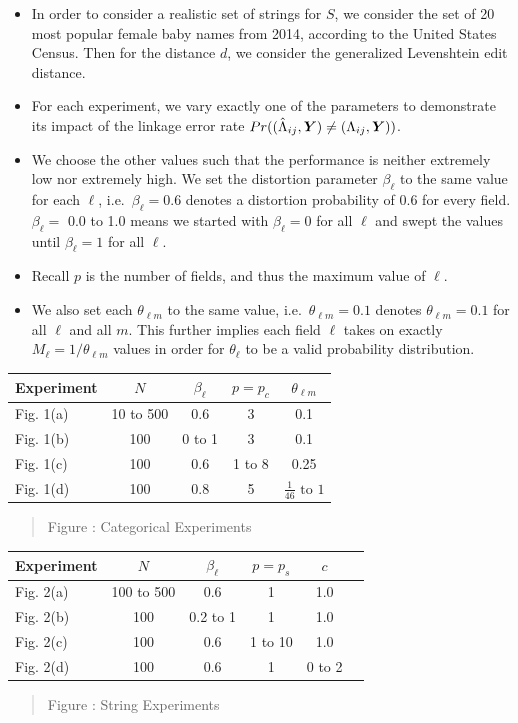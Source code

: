 \documentclass[portrait,a0,final]{a0poster}
\newenvironment{poster}{
  \begin{center}
  \begin{minipage}[c]{0.98\textwidth}
}{
  \end{minipage}
  \end{center}
}
\newcommand{\mycaption}[1]{
  \vspace{0.25cm}
  \begin{quote}
    {{\sc Figure} \arabic{figure}: #1}
  \end{quote}
  \vspace{0.25cm}
  \stepcounter{figure}
}
\begin{document}
\begin{poster}
\begin{multicols}{3}
\begin{itemize}
\item In order to consider a realistic set of strings for $S$, we consider the set of 20 most popular female baby names from 2014, according to the United States Census. Then for the distance $d$, we consider the generalized Levenshtein edit distance.
\item For each experiment, we vary exactly one of the parameters to demonstrate its impact of the linkage error rate $Pr( (\hat{\Lambda}_{ij}, \boldsymbol{Y}) \ne (\Lambda_{ij}, \boldsymbol{Y}))$. 
\item We choose the other values such that the performance is neither extremely low nor extremely high. We set the distortion parameter $\beta_\ell$ to the same value for each $\ell$, i.e.\ $\beta_\ell = 0.6$ denotes a distortion probability of 0.6 for every field. $\beta_\ell = $ 0.0 to 1.0 means we started with $\beta_\ell = 0$ for all $\ell$ and swept the values until $\beta_\ell = 1$ for all $\ell$. \item Recall $p$ is the number of fields, and thus the maximum value of $\ell$. 
\item We also set each $\theta_{\ell m}$ to the same value, i.e.\ $\theta_{\ell m} = 0.1$ denotes $\theta_{\ell m} = 0.1$ for all $\ell$ and all $m$. This further implies each field $\ell$ takes on exactly $M_\ell = 1/\theta_{\ell m}$ values in order for $\theta_\ell$ to be a valid probability distribution.
\end{itemize}

\vspace*{1em} 

\begin{center}
  \begin{tabular}{ l c c c c}
    Experiment & $N$ & $\beta_\ell $ & $p = p_c$  & $\theta_{\ell m}$ \\ \hline
    Fig. 1(a) & 10 to 500 & 0.6 & 3 & 0.1 \\
    Fig. 1(b) & 100  & 0 to 1 & 3 & 0.1 \\
    Fig. 1(c) & 100  & 0.6 & 1 to 8& 0.25 \\
    Fig. 1(d) & 100  & 0.8  & 5& $\frac{1}{46} \text{ to } 1$
  \end{tabular}
  \mycaption{Categorical Experiments}
  \label{table:params}
\end{center}

\begin{center}
  \begin{tabular}{ l c c c c c}
    Experiment & $N$ & $\beta_\ell $ & $p = p_s$ & $c$ \\ \hline
    Fig. 2(a) & 100 to 500 & 0.6  & 1 &  1.0 \\
    Fig. 2(b) & 100  & 0.2 to 1 & 1  & 1.0 \\
    Fig. 2(c) & 100  & 0.6 & 1 to 10  & 1.0 \\
    Fig. 2(d) & 100  & 0.6 & 1 & 0 to 2
  \end{tabular}
  \mycaption{String Experiments}
  \label{table:params-str}
\end{center}






\end{multicols}
\end{poster}
\end{document}
